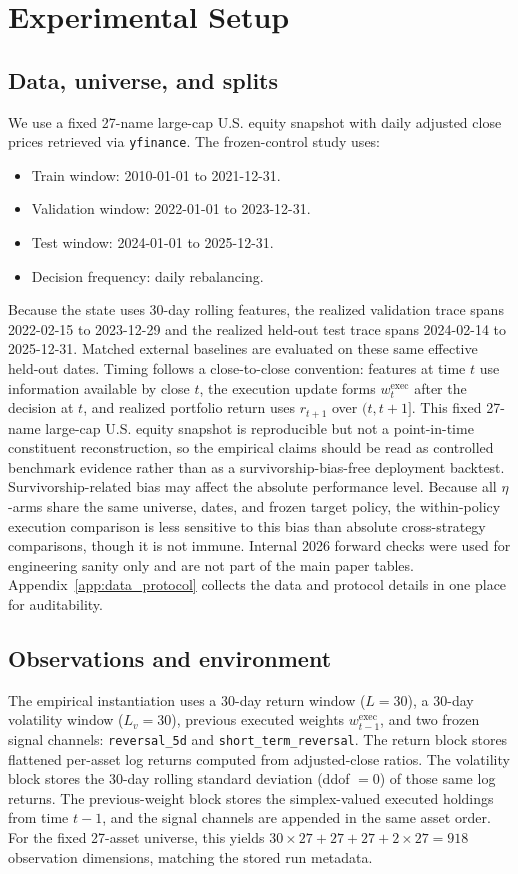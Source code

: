 \documentclass[10pt,twocolumn]{article}
\newcommand{\wexec}{w^{\mathrm{exec}}}
\begin{document}
\section{Experimental Setup}
\label{sec:exp}

\subsection{Data, universe, and splits}
We use a fixed 27-name large-cap U.S. equity snapshot with daily adjusted close prices retrieved via \texttt{yfinance}. The frozen-control study uses:
\begin{itemize}[leftmargin=*,itemsep=1pt]
\item Train window: 2010-01-01 to 2021-12-31.
\item Validation window: 2022-01-01 to 2023-12-31.
\item Test window: 2024-01-01 to 2025-12-31.
\item Decision frequency: daily rebalancing.
\end{itemize}
Because the state uses 30-day rolling features, the realized validation trace spans 2022-02-15 to 2023-12-29 and the realized held-out test trace spans 2024-02-14 to 2025-12-31. Matched external baselines are evaluated on these same effective held-out dates.
Timing follows a close-to-close convention: features at time $t$ use information available by close $t$, the execution update forms $\wexec_t$ after the decision at $t$, and realized portfolio return uses $r_{t+1}$ over $(t,t+1]$. This fixed 27-name large-cap U.S. equity snapshot is reproducible but not a point-in-time constituent reconstruction, so the empirical claims should be read as controlled benchmark evidence rather than as a survivorship-bias-free deployment backtest. Survivorship-related bias may affect the absolute performance level. Because all $\eta$-arms share the same universe, dates, and frozen target policy, the within-policy execution comparison is less sensitive to this bias than absolute cross-strategy comparisons, though it is not immune. Internal 2026 forward checks were used for engineering sanity only and are not part of the main paper tables. Appendix~\ref{app:data_protocol} collects the data and protocol details in one place for auditability.

\subsection{Observations and environment}
The empirical instantiation uses a 30-day return window ($L=30$), a 30-day volatility window ($L_v=30$), previous executed weights $\wexec_{t-1}$, and two frozen signal channels: \texttt{reversal\_5d} and \texttt{short\_term\_reversal}. The return block stores flattened per-asset log returns computed from adjusted-close ratios. The volatility block stores the 30-day rolling standard deviation (ddof $=0$) of those same log returns. The previous-weight block stores the simplex-valued executed holdings from time $t-1$, and the signal channels are appended in the same asset order. For the fixed 27-asset universe, this yields $30\times27 + 27 + 27 + 2\times27 = 918$ observation dimensions, matching the stored run metadata.
\end{document}
